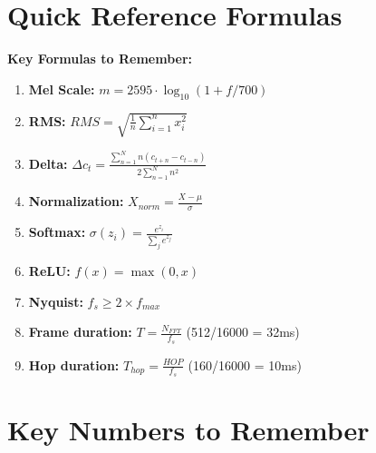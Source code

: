 \documentclass[a4paper,12pt]{article}
\begin{document}
\section{Quick Reference Formulas}

\textbf{Key Formulas to Remember:}

\begin{enumerate}
    \item \textbf{Mel Scale:} $m = 2595 \cdot \log_{10}(1 + f/700)$
    
    \item \textbf{RMS:} $RMS = \sqrt{\frac{1}{n}\sum_{i=1}^{n} x_i^2}$
    
    \item \textbf{Delta:} $\Delta c_t = \frac{\sum_{n=1}^{N} n(c_{t+n} - c_{t-n})}{2\sum_{n=1}^{N} n^2}$
    
    \item \textbf{Normalization:} $X_{norm} = \frac{X - \mu}{\sigma}$
    
    \item \textbf{Softmax:} $\sigma(z_i) = \frac{e^{z_i}}{\sum_j e^{z_j}}$
    
    \item \textbf{ReLU:} $f(x) = \max(0, x)$
    
    \item \textbf{Nyquist:} $f_s \geq 2 \times f_{max}$
    
    \item \textbf{Frame duration:} $T = \frac{N_{FFT}}{f_s}$ (512/16000 = 32ms)
    
    \item \textbf{Hop duration:} $T_{hop} = \frac{HOP}{f_s}$ (160/16000 = 10ms)
\end{enumerate}

\section{Key Numbers to Remember}
\end{document}
